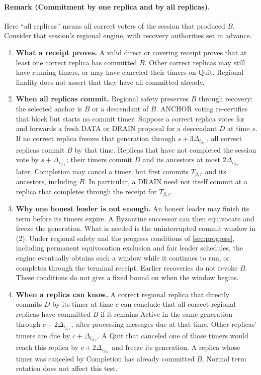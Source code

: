 \documentclass[11pt,a4paper]{article}
\begin{document}
\paragraph{Remark (Commitment by one replica and by all replicas).}
Here ``all replicas'' means all correct voters of the session that
produced $B$. Consider that session's regional engine, with recovery
authorities set in advance.
\begin{enumerate}[label=(\arabic*),itemsep=4pt]
\item \textbf{What a receipt proves.} A valid direct or covering
receipt proves that at least one correct replica has committed $B$.
Other correct replicas may still have running timers, or may have
canceled their timers on Quit. Regional finality does not assert that
they have all committed already.

\item \textbf{When all replicas commit.} Regional safety preserves
$B$ through recovery: the selected anchor is $B$ or a descendant of
$B$. ANCHOR voting re-certifies that block but starts no commit timer.
Suppose a correct replica votes for and forwards a fresh DATA or DRAIN
proposal for a descendant $D$ at time $s$. If no correct replica freezes
that generation through $s+3\Delta_{i_{\beta,r}}$, all correct replicas commit
$B$ by that time. Replicas that have not completed the session vote by
$s+\Delta_{i_{\beta,r}}$; their timers commit $D$ and its ancestors at most
$2\Delta_{i_{\beta,r}}$ later. Completion may cancel a timer, but first commits
$T_{\beta,r}$ and its ancestors, including $B$. In particular, a DRAIN need not
itself commit at a replica that completes through the receipt for $T_{\beta,r}$.

\item \textbf{Why one honest leader is not enough.} An honest leader
may finish its term before its timers expire. A Byzantine successor
can then equivocate and freeze the generation. What is needed is the
uninterrupted commit window in (2). Under regional safety and the
progress conditions of \cref{sec:progress}, including permanent
equivocation exclusion and fair leader schedules, the engine eventually
obtains such a window while it continues to run, or completes through
the terminal receipt. Earlier recoveries do not revoke $B$. These
conditions do not give a fixed bound on when the window begins.

\item \textbf{When a replica can know.} A correct regional replica
that directly commits $D$ by its timer at time $c$ can conclude that
all correct regional replicas have committed $B$ if it remains Active
in the same generation through $c+2\Delta_{i_{\beta,r}}$, after processing
messages due at that time. Other replicas' timers are due by
$c+\Delta_{i_{\beta,r}}$. A Quit that canceled one of those timers would reach
this replica by $c+2\Delta_{i_{\beta,r}}$ and freeze its generation. A replica
whose timer was canceled by Completion has already committed $B$.
Normal term rotation does not affect this test.


\end{enumerate}
\end{document}
